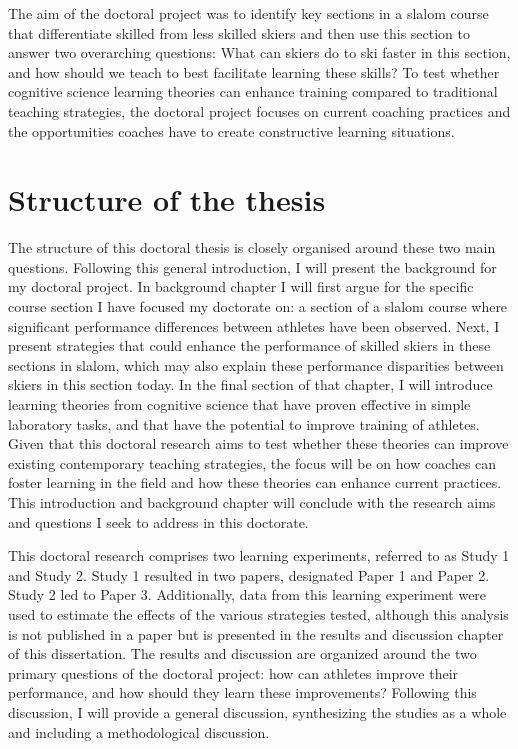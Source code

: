 The aim of the doctoral project was to identify key sections in a slalom course that differentiate skilled from less skilled skiers and then use this section to answer two overarching questions: What can skiers do to ski faster in this section, and how should we teach to best facilitate learning these skills? To test whether cognitive science learning theories can enhance training compared to traditional teaching strategies, the doctoral project focuses on current coaching practices and the opportunities coaches have to create constructive learning situations. 

\section{Structure of the thesis}
The structure of this doctoral thesis is closely organised around these two main questions. Following this general introduction, I will present the background for my doctoral project. In background chapter I will first argue for the specific course section I have focused my doctorate on: a section of a slalom course where significant performance differences between athletes have been observed. Next, I present strategies that could enhance the performance of skilled skiers in these sections in slalom, which may also explain these performance disparities between skiers in this section today. In the final section of that chapter, I will introduce learning theories from cognitive science that have proven effective in simple laboratory tasks, and that have the potential to improve training of athletes. Given that this doctoral research aims to test whether these theories can improve existing contemporary teaching strategies, the focus will be on how coaches can foster learning in the field and how these theories can enhance current practices. This introduction and background chapter will conclude with the research aims and questions I seek to address in this doctorate.

This doctoral research comprises two learning experiments, referred to as Study 1 and Study 2. Study 1 resulted in two papers, designated Paper 1 and Paper 2. Study 2 led to Paper 3. Additionally, data from this learning experiment were used to estimate the effects of the various strategies tested, although this analysis is not published in a paper but is presented in the results and discussion chapter of this dissertation. The results and discussion are organized around the two primary questions of the doctoral project: how can athletes improve their performance, and how should they learn these improvements? Following this discussion, I will provide a general discussion, synthesizing the studies as a whole and including a methodological discussion.

